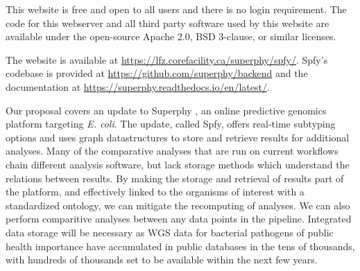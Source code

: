 


This website is free and open to all users and there is no login requirement. The code for this webserver and all third party software used by this website are available under the open-source Apache 2.0, BSD 3-clause, or similar licenses.

The website is available at \url{https://lfz.corefacility.ca/superphy/spfy/}. Spfy's codebase is provided at \url{https://github.com/superphy/backend} and the documentation at \url{https://superphy.readthedocs.io/en/latest/}.

Our proposal covers an update to Superphy \citep{whiteside2016superphy}, an online predictive genomics platform targeting \textit{E. coli}.
The update, called Spfy, offers real-time subtyping options and uses graph datastructures to store and retrieve results for additional analyses.
Many of the comparative analyses that are run on current workflows chain different analysis software, but lack storage methods which understand the relations between results.
By making the storage and retrieval of results part of the platform, and effectively linked to the organisms of interest with a standardized ontology, we can mitigate the recomputing of analyses. We can also perform comparitive analyses between any data points in the pipeline.
Integrated data storage will be necessary as WGS data for bacterial pathogens of public health importance have accumulated in public databases in the tens of thousands, with hundreds of thousands set to be available within the next few years.

